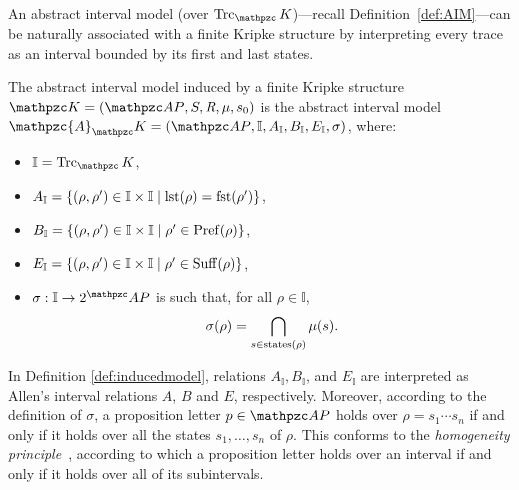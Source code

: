 An abstract interval model (over $\Trk_\Ku$)---recall Definition~\ref{def:AIM}---can be naturally associated with a finite Kripke structure by interpreting every trace as an interval bounded by its first and last states.
\begin{definition}\label{def:inducedmodel}
The abstract interval model induced by a finite Kripke structure $\Ku=\KuDef$ is the abstract interval model $\mathpzc{A}_\Ku=(\Prop,\mathbb{I},A_\mathbb{I},B_\mathbb{I},E_\mathbb{I},\sigma)$, where:
    \begin{itemize}
        \item $\mathbb{I}=\Trk_\Ku$,
        \item $A_\mathbb{I}=\left\{(\rho,\rho')\in\mathbb{I}\times\mathbb{I}\mid \operatorname{lst}(\rho)=\operatorname{fst}(\rho')\right\}$,
        \item $B_\mathbb{I}=\left\{(\rho,\rho')\in\mathbb{I}\times\mathbb{I}\mid \rho'\in\operatorname{Pref}(\rho)\right\}$,
        \item $E_\mathbb{I}=\left\{(\rho,\rho')\in\mathbb{I}\times\mathbb{I}\mid \rho'\in\operatorname{Suff}(\rho)\right\}$,
        \item $\sigma:\mathbb{I}\to 2^\Prop$ is such that, for all $\rho\in\mathbb{I}$, 
        \begin{equation*}
            \sigma(\rho)=\bigcap_{s\in\operatorname{states}(\rho)}\mu(s).
        \end{equation*}
    \end{itemize}
\end{definition}
In Definition \ref{def:inducedmodel}, relations $A_\mathbb{I},B_\mathbb{I}$, and $E_\mathbb{I}$ are interpreted as Allen's interval relations $A$, $B$ and $E$, respectively. Moreover, according to the definition of $\sigma$, a proposition letter $p\in\Prop$ holds over $\rho=s_1\cdots s_n$ if and only if it holds over all the states $s_1, \ldots , s_n$ of $\rho$. This conforms to the \emph{homogeneity principle}~\cite{Roe80}, according to which a proposition letter holds over an interval if and only if it holds over all of its subintervals.

